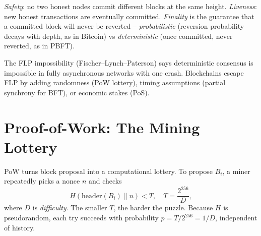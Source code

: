 \begin{definition}\label{def:safety-live}
\emph{Safety}: no two honest nodes commit different blocks at the same height. \emph{Liveness}: new honest transactions are eventually committed. \emph{Finality} is the guarantee that a committed block will never be reverted -- \emph{probabilistic} (reversion probability decays with depth, as in Bitcoin) vs \emph{deterministic} (once committed, never reverted, as in PBFT).
\end{definition}

The FLP impossibility (Fischer--Lynch--Paterson) says deterministic consensus is impossible in fully asynchronous networks with one crash. Blockchains escape FLP by adding randomness (PoW lottery), timing assumptions (partial synchrony for BFT), or economic stakes (PoS).

\section{Proof-of-Work: The Mining Lottery}\label{sec:pow}
PoW turns block proposal into a computational lottery. To propose $B_i$, a miner repeatedly picks a nonce $n$ and checks
\begin{equation}\label{eq:pow}
H(\text{header}(B_i)\parallel n) < T,\quad T = \frac{2^{256}}{D},
\end{equation}
where $D$ is \emph{difficulty}. The smaller $T$, the harder the puzzle. Because $H$ is pseudorandom, each try succeeds with probability $p=T/2^{256}=1/D$, independent of history.

